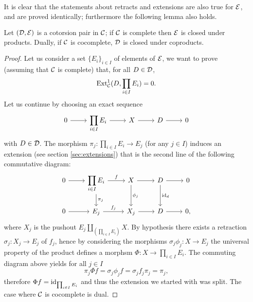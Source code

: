 It is clear that the statements about retracts and extensions are also true for $\mathcal{E}$, and are proved identically; furthermore the following lemma also holds.

\begin{lemma}
	\label{lem:cotorsion-prod}
	Let $(\mathcal{D}, \mathcal{E})$ is a cotorsion pair in $\mathcal{C}$; if $\mathcal{C}$ is complete then $\mathcal{E}$ is closed under products. Dually, if $\mathcal{C}$ is cocomplete, $\mathcal{D}$ is closed under coproducts.
\end{lemma}
\begin{proof}
	Let us consider a set $\{E_i\}_{i\in I}$ of elements of $\mathcal{E}$, we want to prove (assuming that $\mathcal{C}$ is complete) that, for all $D \in \mathcal{D}$,
	\[\mathrm{Ext}^1_{\mathcal{C}}(D, \prod_{i\in I}E_i) = 0.\]
	Let us continue by choosing an exact sequence 
	\[\begin{tikzcd}
		0 & {\displaystyle\prod_{i \in I} E_i} & X & D & {0}
		\arrow[from=1-1, to=1-2]
		\arrow[from=1-2, to=1-3]
		\arrow[from=1-3, to=1-4]
		\arrow[from=1-4, to=1-5]
	\end{tikzcd}\]
	with $D \in \mathcal{D}$. The morphism $\pi_j \colon \prod_{i\in I}E_i \longrightarrow E_j$ (for any $j \in I$) induces an extension (see section \ref{sec:extensions}) that is the second line of the following commutative diagram: 
	\[\begin{tikzcd}
		0 & {\displaystyle\prod_{i \in I} E_i} & X & D & 0 \\
		0 & {E_j} & {X_j} & D & {0,}
		\arrow[from=1-1, to=1-2]
		\arrow["f", from=1-2, to=1-3]
		\arrow["{\pi_j}", from=1-2, to=2-2]
		\arrow[from=1-3, to=1-4]
		\arrow["{\phi_j}", from=1-3, to=2-3]
		\arrow[from=1-4, to=1-5]
		\arrow["{\id_d}", from=1-4, to=2-4]
		\arrow[from=2-1, to=2-2]
		\arrow["f_j", from=2-2, to=2-3]
		\arrow[from=2-3, to=2-4]
		\arrow[from=2-4, to=2-5]
	\end{tikzcd}\]
	where $X_j$ is the pushout $E_j \amalg_{(\prod_{i \in I} E_i)} X$. By hypothesis there exists a retraction $\sigma_j \colon X_j \longrightarrow E_j$ of $f_j$, hence by considering the morphisms $\sigma_j \phi_j \colon X \longrightarrow E_j$ the universal property of the product defines a morphsm $\Phi \colon X \longrightarrow \prod_{i \in I} E_i$. The commuting diagram above yields for all $j \in I$ 
	\[\pi_j \Phi f =  \sigma_j \phi_j f = \sigma_j f_j \pi_j = \pi_j,\]
	therefore $\Phi f = \mathrm{id}_{\prod_{i\in I}E_i}$ and thus the extension we started with was split. The case where $\mathcal{C}$ is cocomplete is dual. 
\end{proof}




